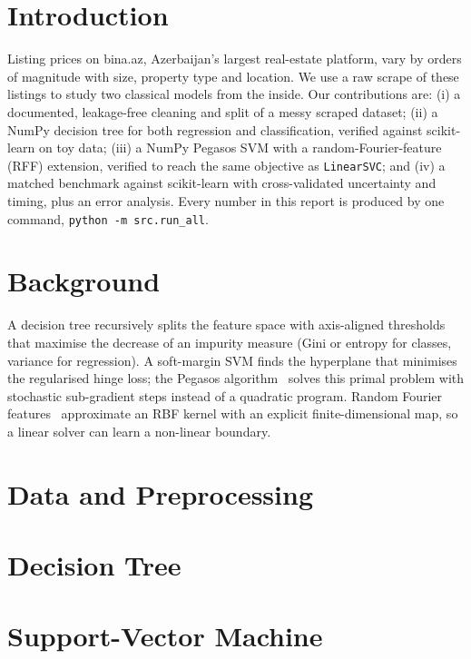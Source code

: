 \documentclass[10pt,twocolumn,a4paper]{article}
\begin{document}
\section{Introduction}
Listing prices on bina.az, Azerbaijan's largest real-estate platform, vary
by orders of magnitude with size, property type and location. We use a raw
scrape of these listings to study two classical models from the inside.
Our contributions are: (i) a documented, leakage-free cleaning and split of
a messy scraped dataset; (ii) a NumPy decision tree for both regression and
classification, verified against scikit-learn on toy data; (iii) a NumPy
Pegasos SVM with a random-Fourier-feature (RFF) extension, verified to
reach the same objective as \texttt{LinearSVC}; and (iv) a matched
benchmark against scikit-learn with cross-validated uncertainty and timing,
plus an error analysis. Every number in this report is produced by one
command, \texttt{python -m src.run\_all}.

\section{Background}
A decision tree recursively splits the feature space with axis-aligned
thresholds that maximise the decrease of an impurity measure (Gini or
entropy for classes, variance for regression). A soft-margin SVM finds the
hyperplane that minimises the regularised hinge loss; the Pegasos
algorithm~\cite{pegasos} solves this primal problem with stochastic
sub-gradient steps instead of a quadratic program. Random Fourier
features~\cite{rff} approximate an RBF kernel with an explicit
finite-dimensional map, so a linear solver can learn a non-linear boundary.

\section{Data and Preprocessing}
\label{sec:data}


\section{Decision Tree}
\label{sec:tree}


\section{Support-Vector Machine}
\label{sec:svm}

\end{document}
